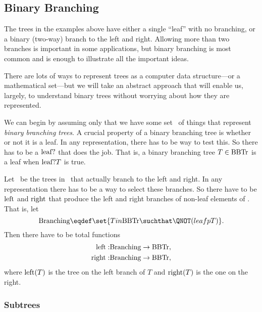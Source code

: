 \subsection{Binary Branching}

The trees in the examples above have either a single ``leaf'' with no
branching, or a binary (two-way) branch to the left and right.
Allowing more than two branches is important in some applications, but
binary branching is most common and is enough to illustrate all the
important ideas.

There are lots of ways to represent trees as a computer data
structure---or a mathematical set---but we will take an abstract
approach that will enable us, largely, to understand binary trees
without worrying about how they are represented.

We can begin by assuming only that we have some set \brnch\ of things
that represent \emph{binary branching trees}.  A crucial property of a
binary branching tree is whether or not it is a leaf.  In any
representation, there has to be way to test this.  So there has to be
a  $\leafp{}$ that does the job.  That is, a
binary branching tree $T \in \text{BBTr}$ is a leaf when $\text{leaf?}T$ is
true.

\iffalse
 We define the
\term{leaves} to be elements that $\leafp{}$ picks out:
\[
\leafset \eqdef \set{T \in \brnch \suchthat \leafp{(T)}}.
\]

So the official definition of ``leaf'' is ``element of the set \leafset.''
\fi

Let \brnchng\ be the trees in \brnch\ that actually branch to the left
and right.  In any representation there has to be a way to select
these branches.  So there have to be 
$\text{left}$ and $\text{right}$ that produce the left and right
branches of non-leaf elements of \brnch.  That is, let
\[
\brnchng \eqdef \set{T in \brnch \suchthat \QNOT(leafp{T})}.
\]
Then there have to be total functions
\begin{align*}
\text{left}: & \text{Branching} \to \text{BBTr},\\
\text{right}:& \text{Branching} \to \text{BBTr},
\end{align*}
where $\text{left}(T)$ is the tree on the left branch of $T$ and
$\text{right}(T)$ is the one on the right.

\subsubsection{Subtrees}

